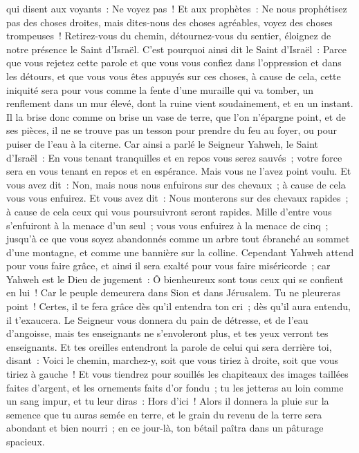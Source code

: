 \begin{multicols}{2}
qui disent aux voyants~: Ne voyez pas~! Et aux prophètes~: Ne nous prophétisez pas des choses droites, mais dites-nous des choses agréables, voyez des choses trompeuses~!
Retirez-vous du chemin, détournez-vous du sentier, éloignez de notre présence le Saint d'Israël.
C'est pourquoi ainsi dit le Saint d'Israël~: Parce que vous rejetez cette parole et que vous vous confiez dans l'oppression et dans les détours, et que vous vous êtes appuyés sur ces choses,
à cause de cela, cette iniquité sera pour vous comme la fente d'une muraille qui va tomber, un renflement dans un mur élevé, dont la ruine vient soudainement, et en un instant.
Il la brise donc comme on brise un vase de terre, que l'on n'épargne point, et de ses pièces, il ne se trouve pas un tesson pour prendre du feu au foyer, ou pour puiser de l'eau à la citerne.
Car ainsi a parlé le Seigneur Yahweh, le Saint d'Israël~: En vous tenant tranquilles et en repos vous serez sauvés~; votre force sera en vous tenant en repos et en espérance. Mais vous ne l'avez point voulu.
Et vous avez dit~: Non, mais nous nous enfuirons sur des chevaux~; à cause de cela vous vous enfuirez. Et vous avez dit~: Nous monterons sur des chevaux rapides~; à cause de cela ceux qui vous poursuivront seront rapides.
Mille d'entre vous s'enfuiront à la menace d'un seul~; vous vous enfuirez à la menace de cinq~; jusqu'à ce que vous soyez abandonnés comme un arbre tout ébranché au sommet d'une montagne, et comme une bannière sur la colline.
Cependant Yahweh attend pour vous faire grâce, et ainsi il sera exalté pour vous faire miséricorde~; car Yahweh est le Dieu de jugement~: Ô bienheureux sont tous ceux qui se confient en lui~!
Car le peuple demeurera dans Sion et dans Jérusalem. Tu ne pleureras point~! Certes, il te fera grâce dès qu'il entendra ton cri~; dès qu'il aura entendu, il t'exaucera.
Le Seigneur vous donnera du pain de détresse, et de l'eau d'angoisse, mais tes enseignants ne s'envoleront plus, et tes yeux verront tes enseignants.
Et tes oreilles entendront la parole de celui qui sera derrière toi, disant~: Voici le chemin, marchez-y, soit que vous tiriez à droite, soit que vous tiriez à gauche~!
Et vous tiendrez pour souillés les chapiteaux des images taillées faites d'argent, et les ornements faits d'or fondu~; tu les jetteras au loin comme un sang impur, et tu leur diras~: Hors d'ici~! 
Alors il donnera la pluie sur la semence que tu auras semée en terre, et le grain du revenu de la terre sera abondant et bien nourri~; en ce jour-là, ton bétail paîtra dans un pâturage spacieux.

\end{multicols}
